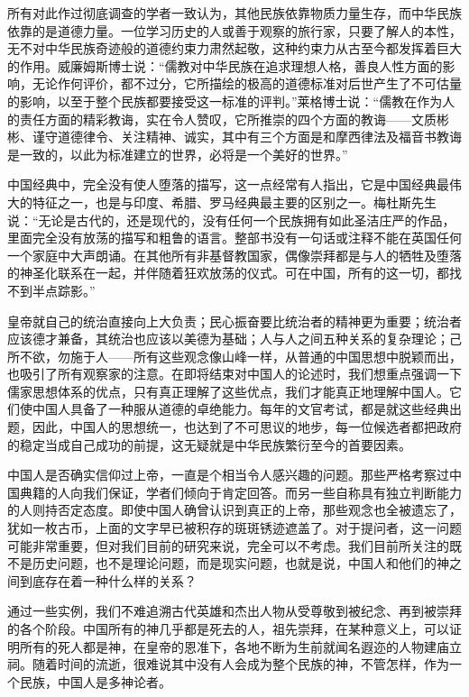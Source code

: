 \documentclass[12pt,oneside]{book}
\begin{document}
\begin{common-format}
所有对此作过彻底调查的学者一致认为，其他民族依靠物质力量生存，而中华民族依靠的是道德力量。一位学习历史的人或善于观察的旅行家，只要了解人的本性，无不对中华民族奇迹般的道德约束力肃然起敬，这种约束力从古至今都发挥着巨大的作用。威廉姆斯博士说：“儒教对中华民族在追求理想人格，善良人性方面的影响，无论作何评价，都不过分，它所描绘的极高的道德标准对后世产生了不可估量的影响，以至于整个民族都要接受这一标准的评判。”莱格博士说：“儒教在作为人的责任方面的精彩教诲，实在令人赞叹，它所推崇的四个方面的教诲——文质彬彬、谨守道德律令、关注精神、诚实，其中有三个方面是和摩西律法及福音书教诲是一致的，以此为标准建立的世界，必将是一个美好的世界。” 

中国经典中，完全没有使人堕落的描写，这一点经常有人指出，它是中国经典最伟大的特征之一，也是与印度、希腊、罗马经典最主要的区别之一。梅杜斯先生说：“无论是古代的，还是现代的，没有任何一个民族拥有如此圣洁庄严的作品，里面完全没有放荡的描写和粗鲁的语言。整部书没有一句话或注释不能在英国任何一个家庭中大声朗诵。在其他所有非基督教国家，偶像崇拜都是与人的牺牲及堕落的神圣化联系在一起，并伴随着狂欢放荡的仪式。可在中国，所有的这一切，都找不到半点踪影。” 

皇帝就自己的统治直接向上大负责；民心振奋要比统治者的精神更为重要；统治者应该德才兼备，其统治也应该以美德为基础；人与人之间五种关系的复杂理论；己所不欲，勿施于人——所有这些观念像山峰一样，从普通的中国思想中脱颖而出，也吸引了所有观察家的注意。在即将结束对中国人的论述时，我们想重点强调一下儒家思想体系的优点，只有真正理解了这些优点，我们才能真正地理解中国人。它们使中国人具备了一种服从道德的卓绝能力。每年的文官考试，都是就这些经典出题，因此，中国人的思想统一，也达到了不可思议的地步，每一位候选者都把政府的稳定当成自己成功的前提，这无疑就是中华民族繁衍至今的首要因素。 

中国人是否确实信仰过上帝，一直是个相当令人感兴趣的问题。那些严格考察过中国典籍的人向我们保证，学者们倾向于肯定回答。而另一些自称具有独立判断能力的人则持否定态度。即使中国人确曾认识到真正的上帝，那些观念也全被遗忘了，犹如一枚古币，上面的文字早已被积存的斑斑锈迹遮盖了。对于提问者，这一问题可能非常重要，但对我们目前的研究来说，完全可以不考虑。我们目前所关注的既不是历史问题，也不是理论问题，而是现实问题，也就是说，中国人和他们的神之间到底存在着一种什么样的关系？ 

通过一些实例，我们不难追溯古代英雄和杰出人物从受尊敬到被纪念、再到被崇拜的各个阶段。中国所有的神几乎都是死去的人，祖先崇拜，在某种意义上，可以证明所有的死人都是神，在皇帝的恩准下，各地不断为生前就闻名遐迩的人物建庙立祠。随着时间的流逝，很难说其中没有人会成为整个民族的神，不管怎样，作为一个民族，中国人是多神论者。 


\end{common-format}
\end{document}
